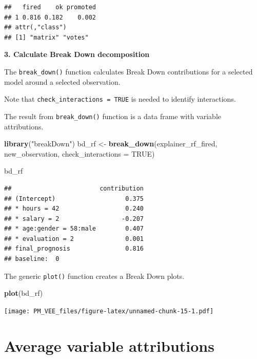 \documentclass[]{krantz}
\newenvironment{Shaded}{\begin{snugshade}}{\end{snugshade}}
\newcommand{\DataTypeTok}[1]{\textcolor[rgb]{0.13,0.29,0.53}{#1}}
\newcommand{\KeywordTok}[1]{\textcolor[rgb]{0.13,0.29,0.53}{\textbf{#1}}}
\newcommand{\NormalTok}[1]{#1}
\newcommand{\OtherTok}[1]{\textcolor[rgb]{0.56,0.35,0.01}{#1}}
\newcommand{\StringTok}[1]{\textcolor[rgb]{0.31,0.60,0.02}{#1}}
\theoremstyle{definition}
\theoremstyle{definition}
\theoremstyle{definition}
\theoremstyle{remark}
\begin{document}
\begin{verbatim}
##   fired    ok promoted
## 1 0.816 0.182    0.002
## attr(,"class")
## [1] "matrix" "votes"
\end{verbatim}

\textbf{3. Calculate Break Down decomposition}

The \texttt{break\_down()} function calculates Break Down contributions
for a selected model around a selected observation.

Note that \texttt{check\_interactions\ =\ TRUE} is needed to identify
interactions.

The result from \texttt{break\_down()} function is a data frame with
variable attributions.

\begin{Shaded}
\begin{Highlighting}[]
\KeywordTok{library}\NormalTok{(}\StringTok{"breakDown"}\NormalTok{)}
\NormalTok{bd_rf <-}\StringTok{ }\KeywordTok{break_down}\NormalTok{(explainer_rf_fired,}
\NormalTok{                 new_observation,}
                 \DataTypeTok{check_interactions =} \OtherTok{TRUE}\NormalTok{)}

\NormalTok{bd_rf}
\end{Highlighting}
\end{Shaded}

\begin{verbatim}
##                        contribution
## (Intercept)                   0.375
## * hours = 42                  0.240
## * salary = 2                 -0.207
## * age:gender = 58:male        0.407
## * evaluation = 2              0.001
## final_prognosis               0.816
## baseline:  0
\end{verbatim}

The generic \texttt{plot()} function creates a Break Down plots.

\begin{Shaded}
\begin{Highlighting}[]
\KeywordTok{plot}\NormalTok{(bd_rf) }
\end{Highlighting}
\end{Shaded}

\texttt{[image: PM\_VEE\_files/figure-latex/unnamed-chunk-15-1.pdf]}

\hypertarget{shapley}{%
\section{Average variable attributions}\label{shapley}}
\end{document}
